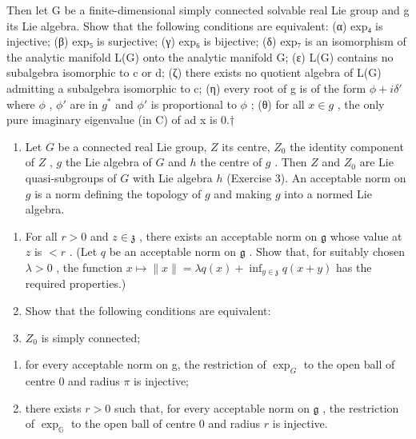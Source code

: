 Then let G be a finite-dimensional simply connected solvable real Lie group and g its Lie algebra. Show that the following conditions are equivalent: (α) exp₄ is injective; (β) exp₅ is surjective; (γ) exp₆ is bijective; (δ) exp₇ is an isomorphism of the analytic manifold L(G) onto the analytic manifold G; (ε) L(G) contains no subalgebra isomorphic to c or d; (ζ) there exists no quotient algebra of L(G) admitting a subalgebra isomorphic to c; (η) every root of g is of the form \(\phi + i\delta'\) where \(\phi\) , \(\phi'\) are in \(g^*\) and \(\phi'\) is proportional to \(\phi\) ; (θ) for all \(x \in g\) , the only pure imaginary eigenvalue (in C) of ad x is 0.†
\relax{}

\begin{enumerate}
\def\labelenumi{\arabic{enumi}.}
\setcounter{enumi}{17}
\tightlist
\item
  Let \(G\) be a connected real Lie group, \(Z\) its centre, \(Z_0\) the identity component of \(Z\) , \(g\) the Lie algebra of \(G\) and \(h\) the centre of \(g\) . Then \(Z\) and \(Z_0\) are Lie quasi-subgroups of \(G\) with Lie algebra \(h\) (Exercise 3). An acceptable norm on \(g\) is a norm defining the topology of \(g\) and making \(g\) into a normed Lie algebra.
\end{enumerate}

\begin{enumerate}
\def\labelenumi{(\alph{enumi})}
\item
  For all \(r > 0\) and \(z \in \mathfrak{z}\) , there exists an acceptable norm on \(\mathfrak{g}\) whose value at \(z\) is \(< r\) . (Let \(q\) be an acceptable norm on \(\mathfrak{g}\) . Show that, for suitably chosen \(\lambda > 0\) , the function \(x \mapsto \|x\| = \lambda q(x) + \inf_{y \in \mathfrak{z}} q(x + y)\) has the required properties.)
\item
  Show that the following conditions are equivalent:
\item
  \(Z_{0}\) is simply connected;
\end{enumerate}

\begin{enumerate}
\def\labelenumi{(\roman{enumi})}
\setcounter{enumi}{1}
\item
  for every acceptable norm on g, the restriction of \(\exp_{G}\) to the open ball of centre 0 and radius \(\pi\) is injective;
\item
  there exists \(r > 0\) such that, for every acceptable norm on \(\mathfrak{g}\) , the restriction of \(\exp_{\mathbb{G}}\) to the open ball of centre 0 and radius \(r\) is injective.
\end{enumerate}

